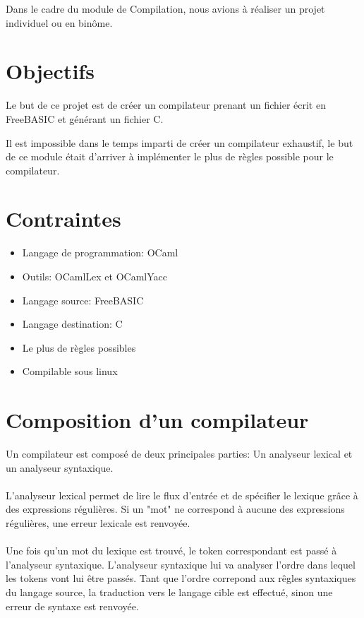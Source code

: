 Dans le cadre du module de Compilation, nous avions à réaliser un projet individuel ou en binôme.

\section{Objectifs}

Le but de ce projet est de créer un compilateur prenant un fichier écrit en FreeBASIC et générant un fichier C.

Il est impossible dans le temps imparti de créer un compilateur exhaustif, le but de ce module était d'arriver à implémenter le plus de règles possible pour le compilateur.


\section{Contraintes}

\begin{itemize}

\item Langage de programmation: OCaml
\item Outils: OCamlLex et OCamlYacc
\item Langage source: FreeBASIC
\item Langage destination: C
\item Le plus de règles possibles
\item Compilable sous linux

\end{itemize}

\section{Composition d'un compilateur}
Un compilateur est composé de deux principales parties: Un analyseur lexical et un analyseur syntaxique. 
\\\\
L'analyseur lexical permet de lire le flux d'entrée et de spécifier le lexique grâce à des expressions régulières. 
Si un "mot" ne correspond à aucune des expressions régulières, une erreur lexicale est renvoyée. 
\\\\
Une fois qu'un mot du lexique est trouvé, le token correspondant est passé à l'analyseur syntaxique. L'analyseur syntaxique lui va analyser l'ordre dans lequel les tokens vont lui être passés. Tant que l'ordre correpond aux rêgles syntaxiques du langage source, la traduction vers le langage cible est effectué, sinon une erreur de syntaxe est renvoyée. 


